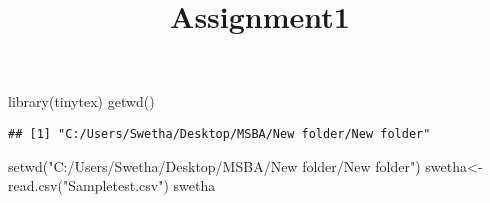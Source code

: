 \documentclass[
]{article}
\title{Assignment1}
\author{}
\date{\vspace{-2.5em}}
\newenvironment{Shaded}{\begin{snugshade}}{\end{snugshade}}
\newcommand{\FunctionTok}[1]{\textcolor[rgb]{0.00,0.00,0.00}{#1}}
\newcommand{\NormalTok}[1]{#1}
\newcommand{\OtherTok}[1]{\textcolor[rgb]{0.56,0.35,0.01}{#1}}
\newcommand{\StringTok}[1]{\textcolor[rgb]{0.31,0.60,0.02}{#1}}
\begin{document}
\maketitle

\begin{Shaded}
\begin{Highlighting}[]
\FunctionTok{library}\NormalTok{(tinytex)}
\FunctionTok{getwd}\NormalTok{()}
\end{Highlighting}
\end{Shaded}

\begin{verbatim}
## [1] "C:/Users/Swetha/Desktop/MSBA/New folder/New folder"
\end{verbatim}

\begin{Shaded}
\begin{Highlighting}[]
\FunctionTok{setwd}\NormalTok{(}\StringTok{"C:/Users/Swetha/Desktop/MSBA/New folder/New folder"}\NormalTok{)}
\NormalTok{swetha}\OtherTok{\textless{}{-}}\FunctionTok{read.csv}\NormalTok{(}\StringTok{"Sampletest.csv"}\NormalTok{)}
\NormalTok{swetha}
\end{Highlighting}
\end{Shaded}
\end{document}
